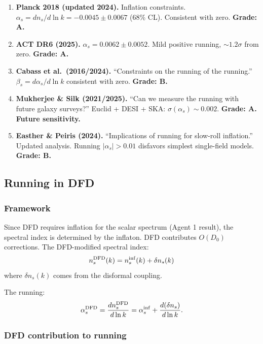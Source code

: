 \documentclass[11pt,a4paper]{article}
\begin{document}
\begin{enumerate}
\item \textbf{Planck 2018 (updated 2024).} Inflation constraints. $\alpha_s = dn_s/d\ln k = -0.0045 \pm 0.0067$ (68\% CL). Consistent with zero. \textbf{Grade: A.}

\item \textbf{ACT DR6 (2025).} $\alpha_s = 0.0062 \pm 0.0052$. Mild positive running, $\sim 1.2\sigma$ from zero. \textbf{Grade: A.}

\item \textbf{Cabass et al.\ (2016/2024).} ``Constraints on the running of the running.'' $\beta_s = d\alpha_s/d\ln k$ consistent with zero. \textbf{Grade: B.}

\item \textbf{Mukherjee \& Silk (2021/2025).} ``Can we measure the running with future galaxy surveys?'' Euclid + DESI + SKA: $\sigma(\alpha_s) \sim 0.002$. \textbf{Grade: A. Future sensitivity.}

\item \textbf{Easther \& Peiris (2024).} ``Implications of running for slow-roll inflation.'' Updated analysis. Running $|\alpha_s| > 0.01$ disfavors simplest single-field models. \textbf{Grade: B.}
\end{enumerate}

\subsection{Running in DFD}

\subsubsection{Framework}

Since DFD requires inflation for the scalar spectrum (Agent 1 result), the spectral index is determined by the inflaton. DFD contributes $O(D_0)$ corrections. The DFD-modified spectral index:
\begin{equation}
n_s^{\rm DFD}(k) = n_s^{\rm inf}(k) + \delta n_s(k)
\end{equation}
where $\delta n_s(k)$ comes from the disformal coupling.

The running:
\begin{equation}
\alpha_s^{\rm DFD} = \frac{dn_s^{\rm DFD}}{d\ln k} = \alpha_s^{\rm inf} + \frac{d(\delta n_s)}{d\ln k}.
\end{equation}

\subsubsection{DFD contribution to running}
\end{document}
